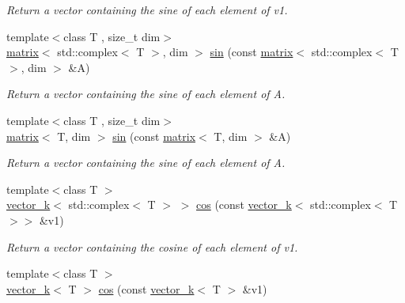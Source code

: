 \begin{DoxyCompactItemize}
\begin{DoxyCompactList}\small\item\em Return a vector containing the sine of each element of v1. \end{DoxyCompactList}\item 
\hypertarget{namespacekeycpp_a18a3ebbda3c25527ae280f5c5725ff4e}{{\footnotesize template$<$class T , size\-\_\-t dim$>$ }\\\hyperlink{classkeycpp_1_1matrix}{matrix}$<$ std\-::complex$<$ T $>$, dim $>$ \hyperlink{namespacekeycpp_a18a3ebbda3c25527ae280f5c5725ff4e}{sin} (const \hyperlink{classkeycpp_1_1matrix}{matrix}$<$ std\-::complex$<$ T $>$, dim $>$ \&A)}\label{namespacekeycpp_a18a3ebbda3c25527ae280f5c5725ff4e}

\begin{DoxyCompactList}\small\item\em Return a vector containing the sine of each element of A. \end{DoxyCompactList}\item 
\hypertarget{namespacekeycpp_aedb234b850e34f9331031d39084fdbb0}{{\footnotesize template$<$class T , size\-\_\-t dim$>$ }\\\hyperlink{classkeycpp_1_1matrix}{matrix}$<$ T, dim $>$ \hyperlink{namespacekeycpp_aedb234b850e34f9331031d39084fdbb0}{sin} (const \hyperlink{classkeycpp_1_1matrix}{matrix}$<$ T, dim $>$ \&A)}\label{namespacekeycpp_aedb234b850e34f9331031d39084fdbb0}

\begin{DoxyCompactList}\small\item\em Return a vector containing the sine of each element of A. \end{DoxyCompactList}\item 
\hypertarget{namespacekeycpp_a917607e20e487553be913b7ccaa4736d}{{\footnotesize template$<$class T $>$ }\\\hyperlink{classkeycpp_1_1vector__k}{vector\-\_\-k}$<$ std\-::complex$<$ T $>$ $>$ \hyperlink{namespacekeycpp_a917607e20e487553be913b7ccaa4736d}{cos} (const \hyperlink{classkeycpp_1_1vector__k}{vector\-\_\-k}$<$ std\-::complex$<$ T $>$$>$ \&v1)}\label{namespacekeycpp_a917607e20e487553be913b7ccaa4736d}

\begin{DoxyCompactList}\small\item\em Return a vector containing the cosine of each element of v1. \end{DoxyCompactList}\item 
\hypertarget{namespacekeycpp_a1d9cd34e13780fffeb1de19287f5636d}{{\footnotesize template$<$class T $>$ }\\\hyperlink{classkeycpp_1_1vector__k}{vector\-\_\-k}$<$ T $>$ \hyperlink{namespacekeycpp_a1d9cd34e13780fffeb1de19287f5636d}{cos} (const \hyperlink{classkeycpp_1_1vector__k}{vector\-\_\-k}$<$ T $>$ \&v1)}\label{namespacekeycpp_a1d9cd34e13780fffeb1de19287f5636d}


\end{DoxyCompactItemize}
